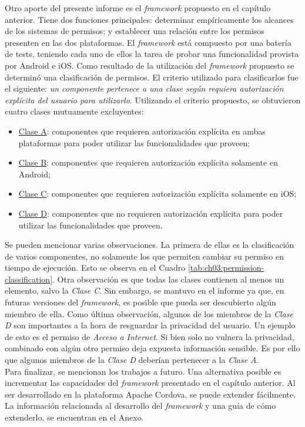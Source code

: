 Otro aporte del presente informe es el \emph{framework} propuesto en el capítulo anterior. Tiene dos funciones principales: determinar empíricamente los alcances de los sistemas de permisos; y establecer una relación entre los permisos presenten en las dos plataformas. El \emph{framework} está compuesto por una batería de tests, teniendo cada uno de ellos la tarea de probar una funcionalidad provista por Android e iOS. Como resultado de la utilización del \emph{framework} propuesto se determinó una clasificación de permisos. El criterio utilizado para clasificarlos fue el siguiente: \emph{un componente pertenece a una clase según requiera autorización explícita del usuario para utilizarlo}. Utilizando el criterio propuesto, se obtuvieron cuatro clases mutuamente excluyentes:
\begin{itemize}
    \item \underline{Clase A}: componentes que requieren autorización explícita en ambas plataformas para poder utilizar las funcionalidades que proveen;
    \item \underline{Clase B}: componentes que requieren autorización explícita solamente en Android;
    \item \underline{Clase C}: componentes que requieren autorización explícita solamente en iOS;
    \item \underline{Clase D}: componentes que no requieren autorización explícita para poder utilizar las funcionalidades que proveen.
\end{itemize}
Se pueden mencionar varias observaciones. La primera de ellas es la clasificación de varios componentes, no solamente los que permiten cambiar su permiso en tiempo de ejecución. Esto se observa en el Cuadro \ref{tab:ch03:permission-classification}. Otra observación es que todas las clases contienen al menos un elemento, salvo la \emph{Clase C}. Sin embargo, se mantuvo en el informe ya que, en futuras versiones del \emph{framework}, es posible que pueda ser descubierto algún miembro de ella. Como última observación, algunos de los miembros de la \emph{Clase D} son importantes a la hora de resguardar la privacidad del usuario. Un ejemplo de esto es el permiso de \emph{Acceso a Internet}. Si bien solo no vulnera la privacidad, combinado con algún otro permiso deja expuesta información sensible. Es por ello que algunos miembros de la \emph{Clase D} deberían pertenecer a la \emph{Clase A}.\\

Para finalizar, se mencionan los trabajos a futuro. Una alternativa posible es incrementar las capacidades del \emph{framework} presentado en el capítulo anterior. Al ser desarrollado en la plataforma Apache Cordova, se puede extender fácilmente. La información relacionada al desarrollo del \emph{framework} y una guía de cómo extenderlo, se encuentran en el Anexo.\\

